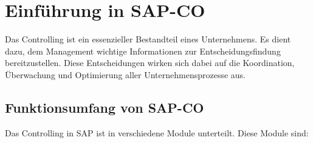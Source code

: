 \newpage
\section{Einführung in SAP-CO}

Das Controlling ist ein essenzieller Bestandteil eines Unternehmens. Es dient dazu, dem Management wichtige Informationen zur Entscheidungsfindung bereitzustellen.
Diese Entscheidungen wirken sich dabei auf die Koordination, Überwachung und Optimierung aller Unternehmensprozesse aus. \cite{ControllingSAP}

\subsection{Funktionsumfang von SAP-CO}
Das Controlling in SAP ist in verschiedene Module unterteilt. Diese Module sind:

